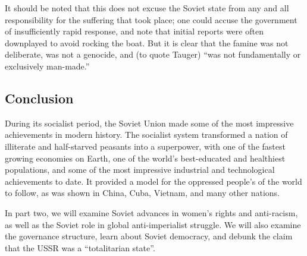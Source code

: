It should be noted that this does not excuse the Soviet state from any
and all responsibility for the suffering that took place; one could
accuse the government of insufficiently rapid response, and note that
initial reports were often downplayed to avoid rocking the boat. But it
is clear that the famine was not deliberate, was not a genocide, and (to
quote Tauger) ``was not fundamentally or exclusively man-made.''

\subsection*{Conclusion}

During its socialist period, the Soviet Union made some of the most
impressive achievements in modern history. The socialist system
transformed a nation of illiterate and half-starved peasants into a
superpower, with one of the fastest growing economies on Earth, one of
the world's best-educated and healthiest populations, and some of the
most impressive industrial and technological achievements to date. It
provided a model for the oppressed people's of the world to follow, as
was shown in China, Cuba, Vietnam, and many other nations.

In part two, we will examine Soviet advances in women's rights and
anti-racism, as well as the Soviet role in global anti-imperialist
struggle. We will also examine the governance structure, learn about
Soviet democracy, and debunk the claim that the USSR was a
``totalitarian state''.

